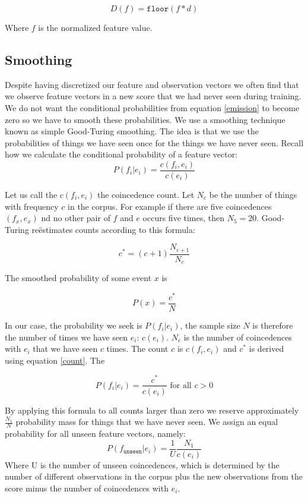 \documentclass[a4paper,10pt]{article}
\begin{document}
\begin{equation}
D(f) = \texttt{floor}(f*d)
\end{equation}

Where $f$ is the normalized feature value.

\subsection{Smoothing}
\label{sec:smoothing}

Despite having discretized our feature and observation vectors we often find that we observe feature vectors in a new score that we had never seen during training. We do not want the conditional probabilities from equation \ref{emission} to become zero so we have to smooth these probabilities. We use a smoothing technique known as simple Good-Turing smoothing. The idea is that we use the probabilities of things we have seen once for the things we have never seen. Recall how we calculate the conditional probability of a feature vector:
\[
P(f_i|e_i) = \frac{c(f_i, e_i)}{c(e_i)}
\]

Let us call the $c(f_i, e_i)$ the coincedence count. Let $N_c$ be the number of things with frequency $c$ in the corpus. For example if there are five coincedences $(f_x, e_x)$ nd no other pair of $f$ and $e$ occurs five times, then $N_{5} = 20$. Good-Turing re\"estimates counts according to this formula:

\begin{equation}
\label{count}
c^* = (c+1) \frac{N_{c+1}}{N_c}
\end{equation}

The smoothed probability of some event $x$ is

\[P(x) = \frac{c^*}{N}\]

In our case, the probability we seek is $P(f_i|e_i)$, the sample size $N$ is therefore the number of times we have seen $e_i$: $c(e_i)$. $N_c$ is the number of coincedences with $e_i$ that we have seen $c$ times. The count $c$ is $c(f_i, e_i)$ and $c^*$ is derived using equation \ref{count}. The 

\[P(f_i|e_i) = \frac{c^*}{c(e_i)} \mbox{ for all } c > 0 \]

By applying this formula to all counts larger than zero we reserve approximately $\frac{N_1}{N}$ probability mass for things that we have never seen. We assign an equal probability for all unseen feature vectors, namely:
\[
P(f_{\texttt{unseen}}|e_i) = \frac{1}{U} \frac{N_1}{c(e_i)} 
\]
Where U is the number of unseen coincedences, which is determined by the number of different observations in the corpus plus the new observations from the score minus the number of coincedences with $e_i$.
\end{document}
